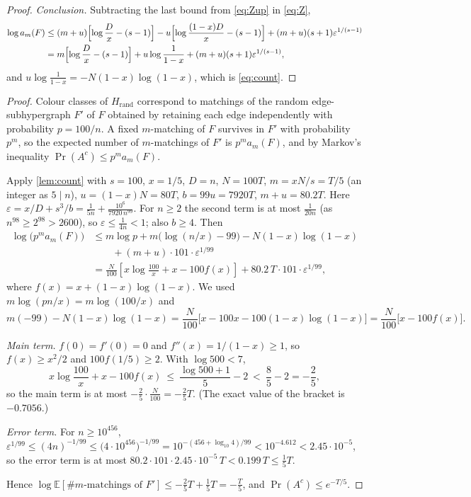 \documentclass[11pt,a4paper]{article}
\theoremstyle{plain}
\theoremstyle{definition}
\theoremstyle{remark}
\newcommand{\E}{\mathbb E}
\newcommand{\Hrand}{H_{\mathrm{rand}}}
\begin{document}
\begin{proof}
\emph{Conclusion.} Subtracting the last bound from \eqref{eq:Zup} in \eqref{eq:Z},
\begin{align*}
\log a_m(F)&\le(m+u)\Bigl[\log\frac Dx-(s-1)\Bigr]-u\Bigl[\log\frac{(1-x)D}{x}-(s-1)\Bigr]+(m+u)(s+1)\varepsilon^{1/(s-1)}\\
&=m\Bigl[\log\frac Dx-(s-1)\Bigr]+u\log\frac1{1-x}+(m+u)(s+1)\varepsilon^{1/(s-1)},
\end{align*}
and $u\log\frac1{1-x}=-N(1-x)\log(1-x)$, which is \eqref{eq:count}.
\end{proof}

\label{pf:firstmoment}
\propFM*
\begin{proof}
Colour classes of $\Hrand$ correspond to matchings of the random edge-subhypergraph $F'$ of $F$ obtained by retaining each edge independently with probability $p=100/n$. A fixed $m$-matching of $F$ survives in $F'$ with probability $p^m$, so the expected number of $m$-matchings of $F'$ is $p^m a_m(F)$, and by Markov's inequality $\Pr(A^c)\le p^m a_m(F)$.

Apply \cref{lem:count} with $s=100$, $x=1/5$, $D=n$, $N=100T$, $m=xN/s=T/5$ (an integer as $5\mid n$), $u=(1-x)N=80T$, $b=99u=7920T$, $m+u=80.2T$. Here $\varepsilon=x/D+s^3/b=\frac1{5n}+\frac{10^6}{7920\,n^{99}}$. For $n\ge2$ the second term is at most $\frac1{20n}$ (as $n^{98}\ge2^{98}>2600$), so $\varepsilon\le\frac1{4n}<1$; also $b\ge4$. Then
\begin{align*}
\log\bigl(p^m a_m(F)\bigr)
&\le m\log p+m\bigl(\log(n/x)-99\bigr)
       -N(1-x)\log(1-x)\\
&\qquad +(m+u)\cdot101\cdot\varepsilon^{1/99}\\
&=\frac N{100}\left[x\log\frac{100}{x}+x-100f(x)\right]
       +80.2\,T\cdot101\cdot\varepsilon^{1/99},
\end{align*}
where $f(x)=x+(1-x)\log(1-x)$. We used $m\log(pn/x)=m\log(100/x)$ and
\[
m(-99)-N(1-x)\log(1-x)
=\frac N{100}\bigl[x-100x-100(1-x)\log(1-x)\bigr]
=\frac N{100}\bigl[x-100f(x)\bigr].
\]

\emph{Main term.} $f(0)=f'(0)=0$ and $f''(x)=1/(1-x)\ge1$, so $f(x)\ge x^2/2$ and $100f(1/5)\ge2$. With $\log500<7$,
\[
x\log\frac{100}x+x-100f(x)\ \le\ \frac{\log500+1}{5}-2\ <\ \frac85-2=-\frac25,
\]
so the main term is at most $-\frac25\cdot\frac N{100}=-\frac25T$. (The exact value of the bracket is $-0.7056$.)

\emph{Error term.} For $n\ge10^{456}$, $\varepsilon^{1/99}\le(4n)^{-1/99}\le\bigl(4\cdot10^{456}\bigr)^{-1/99}=10^{-(456+\log_{10}4)/99}<10^{-4.612}<2.45\cdot10^{-5}$, so the error term is at most $80.2\cdot101\cdot2.45\cdot10^{-5}\,T<0.199\,T\le\frac15T$.

Hence $\log\E[\#\text{$m$-matchings of }F']\le-\frac25T+\frac15T=-\frac T5$, and $\Pr(A^c)\le e^{-T/5}$.
\end{proof}
\end{document}
